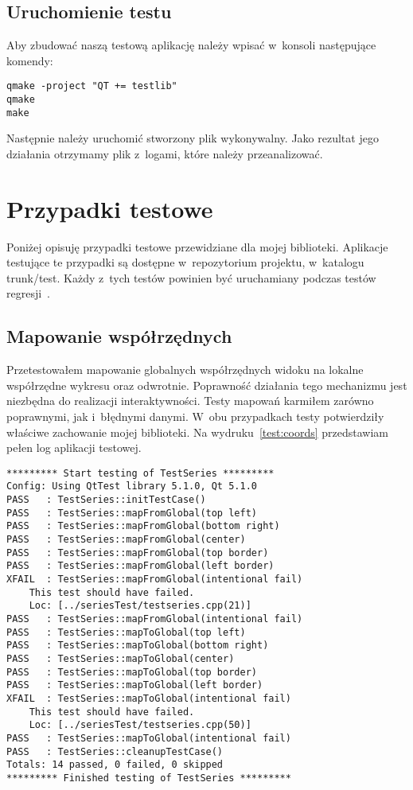 \subsection{Uruchomienie testu}
Aby zbudować naszą testową aplikację należy wpisać w~konsoli następujące komendy:
\begin{lstlisting}
qmake -project "QT += testlib"
qmake
make
\end{lstlisting}

Następnie należy uruchomić stworzony plik wykonywalny. Jako rezultat jego działania otrzymamy plik z~logami, które należy przeanalizować.

\section{Przypadki testowe}
Poniżej opisuję przypadki testowe przewidziane dla mojej biblioteki. Aplikacje testujące te przypadki są dostępne w~repozytorium projektu, w~katalogu trunk/test. Każdy z~tych testów powinien być uruchamiany podczas testów regresji~\cite{Sacha}.

\subsection{Mapowanie współrzędnych}
Przetestowałem mapowanie globalnych współrzędnych widoku na lokalne współrzędne wykresu oraz odwrotnie. Poprawność działania tego mechanizmu jest niezbędna do realizacji interaktywności. Testy mapowań karmiłem zarówno poprawnymi, jak i~błędnymi danymi. W~obu przypadkach testy potwierdziły właściwe zachowanie mojej biblioteki. Na wydruku~\ref{test:coords} przedstawiam pełen log aplikacji testowej.


\begin{lstlisting}[caption=Test mapowania współrzędnych, label=test:coords]
********* Start testing of TestSeries *********
Config: Using QtTest library 5.1.0, Qt 5.1.0
PASS   : TestSeries::initTestCase()
PASS   : TestSeries::mapFromGlobal(top left)
PASS   : TestSeries::mapFromGlobal(bottom right)
PASS   : TestSeries::mapFromGlobal(center)
PASS   : TestSeries::mapFromGlobal(top border)
PASS   : TestSeries::mapFromGlobal(left border)
XFAIL  : TestSeries::mapFromGlobal(intentional fail) 
	This test should have failed.
	Loc: [../seriesTest/testseries.cpp(21)]
PASS   : TestSeries::mapFromGlobal(intentional fail)
PASS   : TestSeries::mapToGlobal(top left)
PASS   : TestSeries::mapToGlobal(bottom right)
PASS   : TestSeries::mapToGlobal(center)
PASS   : TestSeries::mapToGlobal(top border)
PASS   : TestSeries::mapToGlobal(left border)
XFAIL  : TestSeries::mapToGlobal(intentional fail) 
	This test should have failed.
	Loc: [../seriesTest/testseries.cpp(50)]
PASS   : TestSeries::mapToGlobal(intentional fail)
PASS   : TestSeries::cleanupTestCase()
Totals: 14 passed, 0 failed, 0 skipped
********* Finished testing of TestSeries *********
\end{lstlisting}

